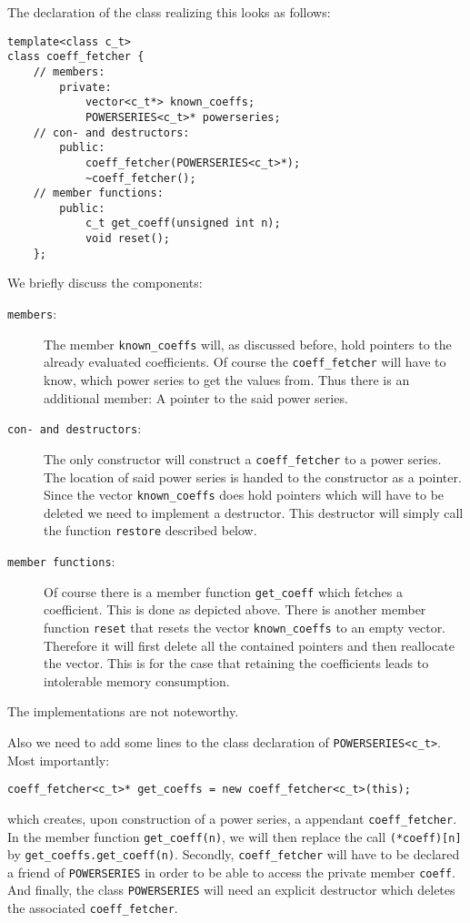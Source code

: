 \documentclass{article}
\newcommand{\code}[1]{\texttt{#1}}
\newcommand{\func}[1]{\texttt{#1}}
\begin{document}
The declaration of the class realizing this looks as follows:
\begin{lstlisting}
template<class c_t>
class coeff_fetcher {
	// members:
		private:
			vector<c_t*> known_coeffs;
			POWERSERIES<c_t>* powerseries;
	// con- and destructors:
		public:
			coeff_fetcher(POWERSERIES<c_t>*);
			~coeff_fetcher();
	// member functions:
		public:
			c_t get_coeff(unsigned int n);
			void reset();
	};
\end{lstlisting}
We briefly discuss the components:
\begin{description}
\item[\code{members}:] The member \code{known\_coeffs} will, as discussed before, hold pointers to the already evaluated coefficients. Of course the \code{coeff\_fetcher} will have to know, which power series to get the values from. Thus there is an additional member: A pointer to the said power series.
\item[\code{con- and destructors}:] The only constructor will construct a \code{coeff\_fetcher} to a power series. The location of said power series is handed to the constructor as a pointer. Since the vector \code{known\_coeffs} does hold pointers which will have to be deleted we need to implement a destructor. This destructor will simply call the function \code{restore} described below.
\item[\code{member functions}:] Of course there is a member function \code{get\_coeff} which fetches a coefficient. This is done as depicted above. There is another member function \code{reset} that resets the vector \code{known\_coeffs} to an empty vector. Therefore it will first delete all the contained pointers and then reallocate the vector. This is for the case that retaining the coefficients leads to intolerable memory consumption.
\end{description}
The implementations are not noteworthy.

Also we need to add some lines to the class declaration of \func{POWERSERIES<c\_t>}. Most importantly:
\begin{lstlisting}
coeff_fetcher<c_t>* get_coeffs = new coeff_fetcher<c_t>(this);
\end{lstlisting}
which creates, upon construction of a power series, a appendant \code{coeff\_fetcher}. In the member function \code{get\_coeff(n)}, we will then replace the call \code{(*coeff)[n]} by \code{get\_coeffs.get\_coeff(n)}. Secondly, \code{coeff\_fetcher} will have to be declared a friend of \func{POWERSERIES} in order to be able to access the private member \code{coeff}. And finally, the class \func{POWERSERIES} will need an explicit destructor which deletes the associated \code{coeff\_fetcher}.
\end{document}
